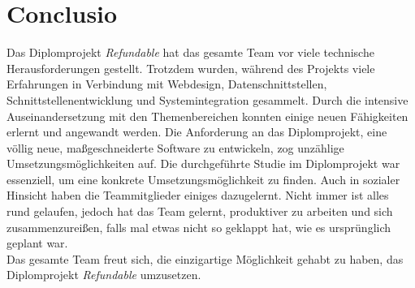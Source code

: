 \chapter{Conclusio}
Das Diplomprojekt \textit{Refundable} hat das gesamte Team vor viele technische Herausforderungen gestellt. Trotzdem wurden, während des Projekts viele Erfahrungen in Verbindung mit Webdesign, Datenschnittstellen, Schnittstellenentwicklung und Systemintegration gesammelt. Durch die intensive Auseinandersetzung mit den Themenbereichen konnten einige neuen Fähigkeiten erlernt und angewandt werden. Die Anforderung an das Diplomprojekt, eine völlig neue, maßgeschneiderte Software zu entwickeln, zog unzählige Umsetzungsmöglichkeiten auf. Die durchgeführte Studie im Diplomprojekt war essenziell, um eine konkrete Umsetzungsmöglichkeit zu finden. Auch in sozialer Hinsicht haben die Teammitglieder einiges dazugelernt. Nicht immer ist alles rund gelaufen, jedoch hat das Team gelernt, produktiver zu arbeiten und sich zusammenzureißen, falls mal etwas nicht so geklappt hat, wie es ursprünglich geplant war.\\Das gesamte Team freut sich, die einzigartige Möglichkeit gehabt zu haben, das Diplomprojekt \textit{Refundable} umzusetzen.